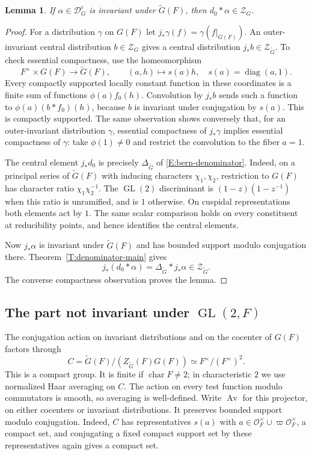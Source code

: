 \documentclass[11pt,a4paper]{amsart}
\newcommand{\mcD}{\mathcal D}
\newcommand{\mcZ}{\mathcal Z}
\newtheorem{lemma}[theorem]{Lemma}
\theoremstyle{definition}
\theoremstyle{remark}
\DeclareMathOperator{\GL}{GL}
\begin{document}
\begin{lemma}\label{L:sl2-descent}
If $\alpha\in\mcD_G^c$ is invariant under $\widetilde G(F)$,
then $d_0*\alpha\in\mcZ_G$.
\end{lemma}
\begin{proof}
For a distribution $\gamma$ on $G(F)$ let
$j_*\gamma(f)=\gamma(f|_{G(F)})$. An outer-invariant central
distribution $b\in\mcZ_G$ gives a central distribution
$j_*b\in\mcZ_{\widetilde G}$. To check essential compactness,
use the homeomorphism
$$
 F^\times\times G(F)\longrightarrow\widetilde G(F),
 \qquad (a,h)\longmapsto s(a)h,
 \quad s(a)=\operatorname{diag}(a,1).
$$
Every compactly supported locally constant function in these
coordinates is a finite sum of functions $\phi(a)f_0(h)$.
Convolution by $j_*b$ sends such a function to
$\phi(a)(b*f_0)(h)$, because $b$ is invariant under conjugation
by $s(a)$. This is compactly supported. The same observation shows
conversely that, for an outer-invariant distribution $\gamma$,
essential compactness of $j_*\gamma$ implies essential compactness
of $\gamma$: take $\phi(1)\ne0$ and restrict the convolution to
the fiber $a=1$.

The central element $j_*d_0$ is precisely
$\Delta_{\widetilde G}$ of \eqref{E:bern-denominator}.
Indeed, on a principal series of $\widetilde G(F)$ with inducing
characters $\chi_1,\chi_2$, restriction to $G(F)$ has character
ratio $\chi_1\chi_2^{-1}$. The $\GL(2)$ discriminant is
$(1-z)(1-z^{-1})$ when this ratio is unramified, and is $1$
otherwise. On cuspidal representations both elements act by
$1$. The same scalar comparison holds on every constituent at
reducibility points, and hence identifies the central elements.

Now $j_*\alpha$ is invariant under $\widetilde G(F)$ and has bounded
support modulo conjugation there. Theorem~\ref{T:denominator-main}
gives
$$
 j_*(d_0*\alpha)=\Delta_{\widetilde G}*j_*\alpha
                       \in\mcZ_{\widetilde G}.
$$
The converse compactness observation proves the lemma.
\end{proof}

\subsection{The part not invariant under \texorpdfstring{$\GL(2,F)$}{GL(2,F)}}
The conjugation action on invariant distributions and on the cocenter
of $G(F)$ factors through
$$
 C=\widetilde G(F)/(Z_{\widetilde G}(F)G(F))
                 \simeq F^\times/(F^\times)^2.
$$
This is a compact group. It is finite if $\operatorname{char}F\ne2$;
in characteristic $2$ we use normalized Haar averaging on $C$.
The action on every test function modulo commutators is smooth, so
averaging is well-defined. Write $\operatorname{Av}$ for this
projector, on either cocenters or invariant distributions.
It preserves bounded support modulo conjugation. Indeed, $C$ has
representatives $s(a)$ with
$a\in\mathcal O_F^\times\cup\varpi\mathcal O_F^\times$, a compact
set, and conjugating a fixed compact support set by these
representatives again gives a compact set.
\end{document}
